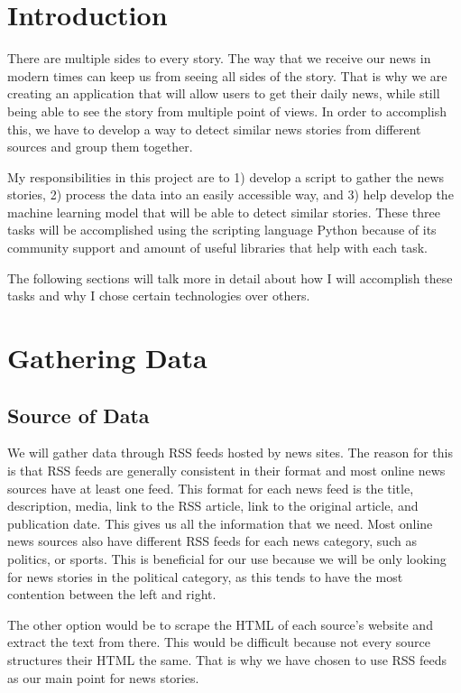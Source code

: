 \documentclass[onecolumn, draftclsnofoot,10pt, compsoc]{IEEEtran}
\begin{document}
\section{Introduction}
There are multiple sides to every story. The way that we receive our news in modern times can keep us from seeing all sides of the story. That is why we are creating an application that will allow users to get their daily news, while still being able to see the story from multiple point of views. In order to accomplish this, we have to develop a way to detect similar news stories from different sources and group them together. \par
My responsibilities in this project are to 1) develop a script to gather the news stories, 2) process the data into an easily accessible way, and 3) help develop the machine learning model that will be able to detect similar stories. These three tasks will be accomplished using the scripting language Python because of its community support and amount of useful libraries that help with each task. \par
The following sections will talk more in detail about how I will accomplish these tasks and why I chose certain technologies over others.
\section{Gathering Data}
\subsection{Source of Data}
We will gather data through RSS feeds hosted by news sites. The reason for this is that RSS feeds are generally consistent in their format and most online news sources have at least one feed. This format for each news feed is the title, description, media, link to the RSS article, link to the original article, and publication date. This gives us all the information that we need. Most online news sources also have different RSS feeds for each news category, such as politics, or sports. This is beneficial for our use because we will be only looking for news stories in the political category, as this tends to have the most contention between the left and right.\par
The other option would be to scrape the HTML of each source's website and extract the text from there. This would be difficult because not every source structures their HTML the same. That is why we have chosen to use RSS feeds as our main point for news stories. \par
\end{document}
